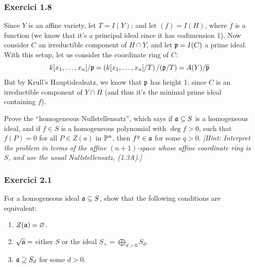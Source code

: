 \documentclass[11pt, a4paper]{article}
\begin{document}
\subsubsection{Exercici 1.8}
Since $Y$ is an affine variety, let $T = I(Y)$; and let $(f)=I(H)$, where $f$ is a function (we know that it's a principal ideal since it has codimension 1). Now consider $C$ an irreductible component of $H\cap Y$, and let $\mathfrak p = I(C)$ a prime ideal. With this setup, let us consider the coordinate ring of $C$:
\[
    k[x_1,\dots,x_n]/\mathfrak p = \left( k[x_1,\dots, x_n]/T\right)/(\mathfrak p/T)=A(Y)/\overline{\mathfrak p}
\]
But by Krull's Hauptidealsatz, we know that $\mathfrak p$ has height 1; since $C$ is an irreductible component of $Y\cap H$ (and thus it's the minimal prime ideal containing $f$).
\newpage
\begin{tcolorbox}[title=\subsection{Exercici 2.1}]
    Prove the ``homogeneous Nullstellensatz'', which says if $\mathfrak a \subseteq S$ is a homogeneous ideal, and if $f\in S$ is a homogeneous polynomial with $\deg f > 0$, such that $f(P) = 0$ for all $P \in Z( a)$ in $\mathbb P^n$, then $f^q\in \mathfrak a$ for some $q > 0$. \textit{[Hint: Interpret the problem in terms of the affine $(n + 1)$-space whose affine coordinate ring is $S$, and use the usual Nullstellensatz, (1.3A).]}
\end{tcolorbox}
\subsubsection{Exercici 2.1}
\newpage
\begin{tcolorbox}[title=\subsection{Exercici 2.2}]
    For a homogeneous ideal $\mathfrak a \subseteq S$, show that the following conditions are equivalent:
    \begin{enumerate}
        \item $Z(\mathfrak a)=\varnothing$.
        \item $\sqrt{\mathfrak a} = $ either $S$ or the ideal $S_+=\bigoplus_{d>0}S_d$.
        \item $\mathfrak a\supseteq S_d$ for some $d>0$.
    \end{enumerate}
\end{tcolorbox}
\end{document}
